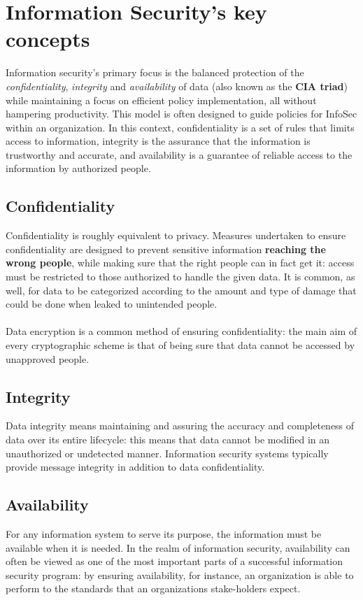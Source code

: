 \documentclass[Lau,binding=0.6cm,oneside]{sapthesis}
\begin{document}
\section{Information Security's key concepts}
Information security's primary focus is the balanced protection of the \textit{confidentiality}, \textit{integrity} and \textit{availability} of data (also known as the \textbf{CIA triad}) while maintaining a focus on efficient policy implementation, all without hampering productivity. This model is often designed to guide policies for InfoSec within an organization. In this context, confidentiality is a set of rules that limits access to information, integrity is the assurance that the information is trustworthy and accurate, and availability is a guarantee of reliable access to the information by authorized people.

\subsection{Confidentiality}
Confidentiality is roughly equivalent to privacy. Measures undertaken to ensure confidentiality are designed to prevent sensitive information \textbf{reaching the wrong people}, while making sure that the right people can in fact get it: access must be restricted to those authorized to handle the given data. It is common, as well, for data to be categorized according to the amount and type of damage that could be done when leaked to unintended people\supercite{confidentiality}.\\\\
Data encryption is a common method of ensuring confidentiality: the main aim of every cryptographic scheme is that of being sure that data cannot be accessed by unapproved people.

\subsection{Integrity}
Data integrity means maintaining and assuring the accuracy and completeness of data over its entire lifecycle: this means that data cannot be modified in an unauthorized or undetected manner\supercite{integrity}. Information security systems typically provide message integrity in addition to data confidentiality.

\subsection{Availability}
For any information system to serve its purpose, the information must be available when it is needed. In the realm of information security, availability can often be viewed as one of the most important parts of a successful information security program: by ensuring availability, for instance, an organization is able to perform to the standards that an organizations stake-holders expect.
\end{document}
